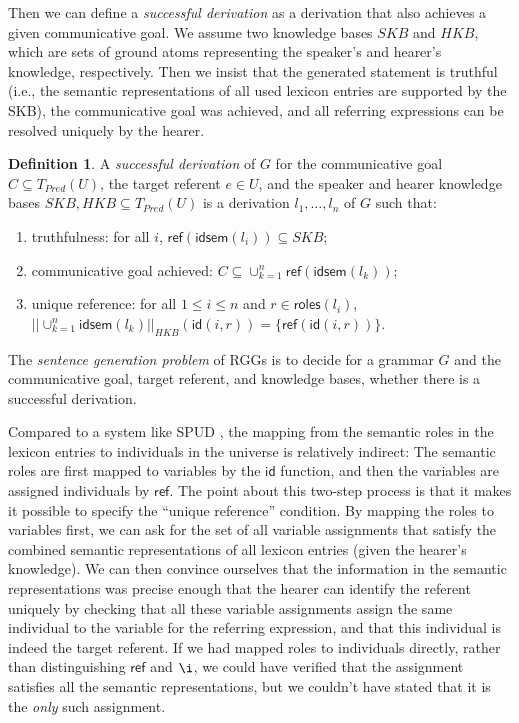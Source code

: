 \documentclass[11pt,a4]{article}
\newcommand{\roles}{\mathsf{roles}}
\newcommand{\refr}{\mathsf{ref}}
\newcommand{\id}{\mathsf{id}}
\newcommand{\idsem}{\mathsf{idsem}}
\theoremstyle{plain}
\theoremstyle{definition}
\newtheorem{definition}[theorem]{Definition}
\begin{document}
Then we can define a \emph{successful derivation} as a derivation that
also achieves a given communicative goal. We assume two knowledge
bases $SKB$ and $HKB$, which are sets of ground atoms representing the
speaker's and hearer's knowledge, respectively. Then we insist that
the generated statement is truthful (i.e., the semantic
representations of all used lexicon entries are supported by the SKB),
the communicative goal was achieved, and all referring expressions can
be resolved uniquely by the hearer.

\begin{definition} \label{def:rgg-succ-deriv} A \emph{successful
    derivation} of $G$ for the communicative goal $C \subseteq
  T_{Pred}(U)$, the target referent $e \in U$, and the speaker and
  hearer knowledge bases $SKB, HKB \subseteq T_{Pred}(U)$ is a
  derivation $l_1,\ldots,l_n$ of $G$ such that:

  \begin{enumerate}
  \item truthfulness: for all $i$, $\refr(\idsem(l_i)) \subseteq SKB$;
  \item communicative goal achieved: $C \subseteq \cup_{k=1}^n \refr(\idsem(l_k))$;
  \item unique reference: for all $1 \leq i \leq n$ and $r \in
    \roles(l_i)$, $|| \cup_{k=1}^n \idsem(l_k) ||_{HKB}(\id(i,r)) =
    \{\refr(\id(i,r))\}$.
  \end{enumerate}

  The \emph{sentence generation problem} of RGGs is to decide for a
  grammar $G$ and the communicative goal, target referent, and
  knowledge bases, whether there is a successful derivation.
\end{definition}

Compared to a system like SPUD \citep{Stone2003a}, the mapping from
the semantic roles in the lexicon entries to individuals in the
universe is relatively indirect: The semantic roles are first mapped
to variables by the $\id$ function, and then the variables are
assigned individuals by $\refr$. The point about this two-step process
is that it makes it possible to specify the ``unique reference''
condition. By mapping the roles to variables first, we can ask for the
set of all variable assignments that satisfy the combined semantic
representations of all lexicon entries (given the hearer's
knowledge). We can then convince ourselves that the information in the
semantic representations was precise enough that the hearer can
identify the referent uniquely by checking that all these variable
assignments assign the same individual to the variable for the
referring expression, and that this individual is indeed the target
referent. If we had mapped roles to individuals directly, rather than
distinguishing $\refr$ and $\i$, we could have verified that the
assignment satisfies all the semantic representations, but we couldn't
have stated that it is the \emph{only} such assignment.
\end{document}
